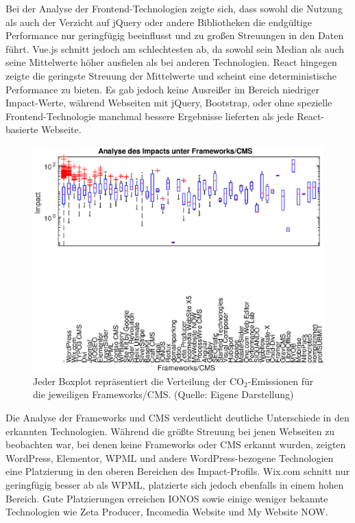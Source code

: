 \documentclass[Bachelor,BIF,german,IEEE]{BASE/twbook}
\begin{document}
\noindent Bei der Analyse der Frontend-Technologien zeigte sich, dass sowohl die Nutzung als auch der Verzicht auf jQuery oder andere Bibliotheken die endgültige Performance nur geringfügig beeinflusst und zu großen Streuungen in den Daten führt. Vue.js schnitt jedoch am schlechtesten ab, da sowohl sein Median als auch seine Mittelwerte höher ausfielen als bei anderen Technologien. React hingegen zeigte die geringste Streuung der Mittelwerte und scheint eine deterministische Performance zu bieten. Es gab jedoch keine Ausreißer im Bereich niedriger Impact-Werte, während Webseiten mit jQuery, Bootstrap, oder ohne spezielle Frontend-Technologie manchmal bessere Ergebnisse lieferten als jede React-basierte Webseite.

\clearpage


\begin{figure}[htp]
\centering
\includegraphics[width=1.0\linewidth]{matlab/distImpactbyFrameworksCMS.eps}
\caption{Jeder Boxplot repräsentiert die Verteilung der CO$_2$-Emissionen für die jeweiligen Frameworks/\ac{CMS}. (Quelle: Eigene Darstellung)}
\label{Abb6}
\end{figure}

\noindent Die Analyse der Frameworks und \ac{CMS} verdeutlicht deutliche Unterschiede in den erkannten Technologien. Während die größte Streuung bei jenen Webseiten zu beobachten war, bei denen keine Frameworks oder \ac{CMS} erkannt wurden, zeigten WordPress, Elementor, WPML und andere WordPress-bezogene Technologien eine Platzierung in den oberen Bereichen des Impact-Profils. Wix.com schnitt nur geringfügig besser ab als WPML, platzierte sich jedoch ebenfalls in einem hohen Bereich. Gute Platzierungen erreichen IONOS sowie einige weniger bekannte Technologien wie Zeta Producer, Incomedia Website und My Website NOW. \newline
\end{document}
